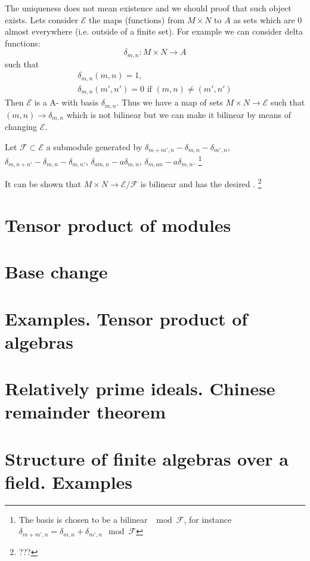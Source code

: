 The uniqueness does not mean existence and we should proof that such
object exists. Lets consider $\mathcal{E}$ the maps (functions) from
$M \times N$ to $A$ as sets which are $0$ almost everywhere
(i.e. outside of a finite set). For example we can consider delta
functions:
\[
\delta_{m,n} : M \times N \to A
\]
such that
\begin{eqnarray}
  \delta_{m,n}(m,n) = 1,
  \nonumber \\
  \delta_{m,n}(m',n') = 0 \mbox{ if } (m,n) \ne (m',n')
  \nonumber 
\end{eqnarray}
Then $\mathcal{E}$ is a A- with basis
$\delta_{m,n}$. Thus we have a map of sets $M \times N \to
\mathcal{E}$ such that $(m,n) \to \delta_{m,n}$ which is not bilinear
but we can make it bilinear by means of changing $\mathcal{E}$.

Let $\mathcal{F} \subset \mathcal{E}$ a submodule generated by
$\delta_{m+m',n} - \delta_{m,n} - \delta_{m',n}$,
$\delta_{m,n+n'} - \delta_{m,n} - \delta_{m,n'}$,
$\delta_{am,n} - a\delta_{m,n}$,
$\delta_{m,an} - a\delta_{m,n}$.
\footnote{
  The basis is chosen to be a bilinear $\mod \mathcal{F}$, for instance
  $\delta_{m+m',n} = \delta_{m,n} + \delta_{m',n} \mod \mathcal{F}$
}

It can be shown that $M \times N \to \mathcal{E}/\mathcal{F}$ is
bilinear and has the desired .
\footnote{
  ???
}


\section{Tensor product of modules}

\section{Base change}

\section{Examples. Tensor product of algebras}

\section{Relatively prime ideals. Chinese remainder theorem}

\section{Structure of finite algebras over a field. Examples}
